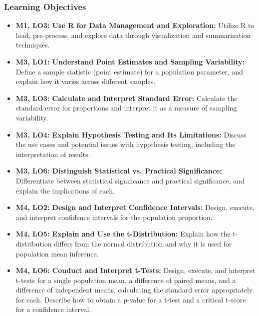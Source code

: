 \begin{frame}
    \frametitle{Learning Objectives}
    \begin{itemize}
        \item \textbf{M1, LO3: Use R for Data Management and Exploration:} Utilize R to load, pre-process, and explore data through visualization and summarization techniques.
        \item \textbf{M3, LO1: Understand Point Estimates and Sampling Variability:} Define a sample statistic (point estimate) for a population parameter, and explain how it varies across different samples.
        \item \textbf{M3, LO3: Calculate and Interpret Standard Error:} Calculate the standard error for proportions and interpret it as a measure of sampling variability.
        \item \textbf{M3, LO4: Explain Hypothesis Testing and Its Limitations:} Discuss the use cases and potential issues with hypothesis testing, including the interpretation of results.
        \item \textbf{M3, LO6: Distinguish Statistical vs. Practical Significance:} Differentiate between statistical significance and practical significance, and explain the implications of each.
        \item \textbf{M4, LO2: Design and Interpret Confidence Intervals:} Design, execute, and interpret confidence intervals for the population proportion.
        \item \textbf{M4, LO5: Explain and Use the t-Distribution:} Explain how the t-distribution differs from the normal distribution and why it is used for population mean inference.
        \item \textbf{M4, LO6: Conduct and Interpret t-Tests:} Design, execute, and interpret t-tests for a single population mean, a difference of paired means, and a difference of independent means, calculating the standard error appropriately for each. Describe how to obtain a p-value for a t-test and a critical t-score for a confidence interval.
    \end{itemize}
\end{frame}
    
